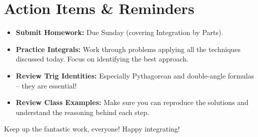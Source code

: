 \documentclass[11pt]{article}
\begin{document}
\section{Action Items \& Reminders}
\begin{itemize}
    \item[\checkmark] \textbf{Submit Homework:} Due Sunday (covering Integration by Parts).
    \item[\checkmark] \textbf{Practice Integrals:} Work through problems applying all the techniques discussed today. Focus on identifying the best approach.
    \item[\checkmark] \textbf{Review Trig Identities:} Especially Pythagorean and double-angle formulas – they are essential!
    \item[\checkmark] \textbf{Review Class Examples:} Make sure you can reproduce the solutions and understand the reasoning behind each step.
\end{itemize}

Keep up the fantastic work, everyone! Happy integrating!

\end{document}
